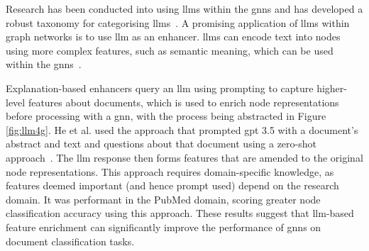 \documentclass[10pt,oneside]{book}
\begin{document}
Research has been conducted into using \glspl*{llm} within the \glspl*{gnn} and has developed a robust taxonomy for categorising \gls*{llm}s~\cite{ren_survey_2024}. A promising application of \glspl*{llm} within graph networks is to use \gls*{llm} as an enhancer. \glspl*{llm} can encode text into nodes using more complex features, such as semantic meaning, which can be used within the \glspl*{gnn}~\cite{zolnai-lucas_stage_2024}.
    
Explanation-based enhancers query an \gls*{llm} using prompting to capture higher-level features about documents, which is used to enrich node representations before processing with a \gls*{gnn}, with the process being abstracted in Figure \ref{fig:llm4g}. He et al. used the approach that prompted \gls*{gpt} 3.5 with a document's abstract and text and questions about that document using a zero-shot approach~\cite{he_harnessing_2024}. The \gls*{llm} response then forms features that are amended to the original node representations. This approach requires domain-specific knowledge, as features deemed important (and hence prompt used) depend on the research domain. It was performant in the PubMed domain, scoring greater node classification accuracy using this approach. These results suggest that \gls*{llm}-based feature enrichment can significantly improve the performance of \glspl*{gnn} on document classification tasks.
\end{document}
